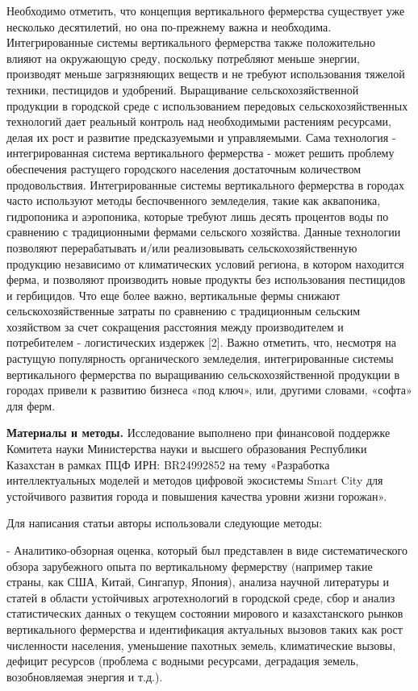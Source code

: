 \begin{multicols}{2}
Необходимо отметить, что концепция вертикального фермерства существует
уже несколько десятилетий, но она по-прежнему важна и необходима.
Интегрированные системы вертикального фермерства также положительно
влияют на окружающую среду, поскольку потребляют меньше энергии,
производят меньше загрязняющих веществ и не требуют использования
тяжелой техники, пестицидов и удобрений. Выращивание
сельскохозяйственной продукции в городской среде с использованием
передовых сельскохозяйственных технологий дает реальный контроль над
необходимыми растениям ресурсами, делая их рост и развитие
предсказуемыми и управляемыми. Сама технология - интегрированная система
вертикального фермерства - может решить проблему обеспечения растущего
городского населения достаточным количеством продовольствия.
Интегрированные системы вертикального фермерства в городах часто
используют методы беспочвенного земледелия, такие как аквапоника,
гидропоника и аэропоника, которые требуют лишь десять процентов воды по
сравнению с традиционными фермами сельского хозяйства. Данные технологии
позволяют перерабатывать и/или реализовывать сельскохозяйственную
продукцию независимо от климатических условий региона, в котором
находится ферма, и позволяют производить новые продукты без
использования пестицидов и гербицидов. Что еще более важно, вертикальные
фермы снижают сельскохозяйственные затраты по сравнению с традиционным
сельским хозяйством за счет сокращения расстояния между производителем и
потребителем - логистических издержек {[}2{]}. Важно отметить, что,
несмотря на растущую популярность органического земледелия,
интегрированные системы вертикального фермерства по выращиванию
сельскохозяйственной продукции в городах привели к развитию бизнеса «под
ключ», или, другими словами, «софта» для ферм.

{\bfseries Материалы и методы.} Исследование выполнено при финансовой
поддержке Комитета науки Министерства науки и высшего образования
Республики Казахстан в рамках ПЦФ ИРН: BR24992852 на тему «Разработка
интеллектуальных моделей и методов цифровой экосистемы Smart City для
устойчивого развития города и повышения качества уровни жизни горожан».

Для написания статьи авторы использовали следующие методы:

- Аналитико-обзорная оценка, который был представлен в виде
систематического обзора зарубежного опыта по вертикальному фермерству
(например такие страны, как США, Китай, Сингапур, Япония), анализа
научной литературы и статей в области устойчивых агротехнологий в
городской среде, сбор и анализ статистических данных о текущем состоянии
мирового и казахстанского рынков вертикального фермерства и
идентификация актуальных вызовов таких как рост численности населения,
уменьшение пахотных земель, климатические вызовы, дефицит ресурсов
(проблема с водными ресурсами, деградация земель, возобновляемая энергия
и т.д.).


\end{multicols}
